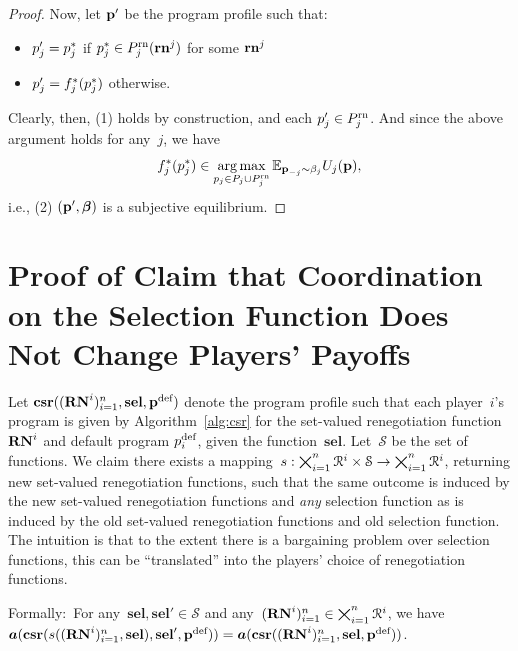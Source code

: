 \documentclass[sigconf]{aamas}
\newcommand{\selection}{sel}%
\newcommand{\renegb}{\mathbf{\selection}}
\theoremstyle{definition}
\begin{document}
\begin{proof}
Now, let $\textbf{p}'$ be the program profile such that:
\begin{itemize}
    \item $p_j' = p_j^*$ if $p_j^* \in P_j^{\textnormal{rn}}(\mathbf{rn}^j)$ for some $\mathbf{rn}^j$
    \item $p_j' = f_j^*(p_j^*)$ otherwise.
\end{itemize}

Clearly, then, (1) holds by construction, and each $p_j' \in P_j^{\textnormal{rn}}$. 
And since the above argument holds for any~$j$,
we have
$$f_j^*(p_j^*) \in \operatorname*{arg\,max}_{p_j \in P_j \cup P_j^{\textnormal{rn}}}
\mathbb{E}_{\textbf{p}_{-j} \sim \beta_j} U_j(\textbf{p}),$$
i.e., (2) $(\textbf{p}', \boldsymbol{\beta})$ is a subjective equilibrium.
\end{proof}

\section{Proof of Claim that Coordination on the Selection Function Does Not Change Players' Payoffs}
\label{app:barg}

Let $\csprog((\renegi)\indices, \renegb, \deffullprog)$ denote the program profile such that each player~$i$'s program is given by Algorithm~\ref{alg:csr}
for the set-valued renegotiation function $\mathbf{RN}^{i}$
and default program $p_i^{\textnormal{def}}$, given the \selfunction{} function~$\renegb$.
Let~$\mathcal{S}$ be the set of \selfunction{} functions.
We claim there exists a mapping~$s : \bigtimes_{i=1}^{{n}} \mathcal{R}^{i} \times \mathcal{S} \to \bigtimes_{i=1}^{{n}} \mathcal{R}^{i}$,
returning new set-valued renegotiation functions,
such that the same outcome is induced by the new set-valued renegotiation functions and \textit{any} selection function
as is induced by the old set-valued renegotiation functions and old selection function.
The intuition is that
to the extent
there is a bargaining problem
over selection
functions,
this can be ``translated'' into the players'
choice of 
renegotiation functions.

Formally:\ For any~$\renegb, \renegb' \in \mathcal{S}$ and any~$(\mathbf{RN}^{i})_{i=1}^{{n}} \in \bigtimes_{i=1}^{{n}} \mathcal{R}^{i}$, we have
$\fullact(\csprog(\genfunc((\renegi)\indices, \renegb), \renegb', \deffullprog)) = \fullact(\csprog((\renegi)\indices, \renegb, \deffullprog))$.
\end{document}
